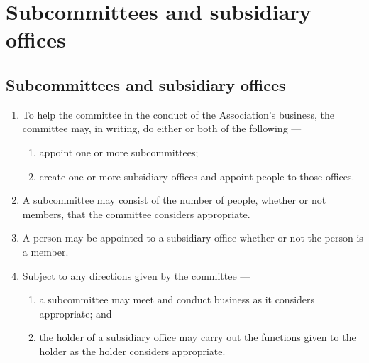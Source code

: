 \documentclass[../constitution.tex]{subfiles}
\begin{document}

\hypertarget{division-5-subcommittees-and-subsidiary-offices}{%
\section{Subcommittees and subsidiary offices}\label{division-5-subcommittees-and-subsidiary-offices}}

\hypertarget{subcommittees-and-subsidiary-offices}{%
\subsection{Subcommittees and subsidiary offices}\label{subcommittees-and-subsidiary-offices}}


\begin{enumerate}

\item To help the committee in the conduct of the Association's business, the committee may, in writing, do either or both of the following ---

  \begin{enumerate}
  
  \item appoint one or more subcommittees; \label{appoint-subcommittees}
  \item create one or more subsidiary offices and appoint people to those offices.
  \end{enumerate}
\item A subcommittee may consist of the number of people, whether or not members, that the committee considers appropriate.
\item A person may be appointed to a subsidiary office whether or not the person is a member.
\item Subject to any directions given by the committee ---

  \begin{enumerate}
  
  \item a subcommittee may meet and conduct business as it considers appropriate; and
  \item the holder of a subsidiary office may carry out the functions given to the holder as the holder considers appropriate.
  \end{enumerate}
\end{enumerate}
\end{document}
